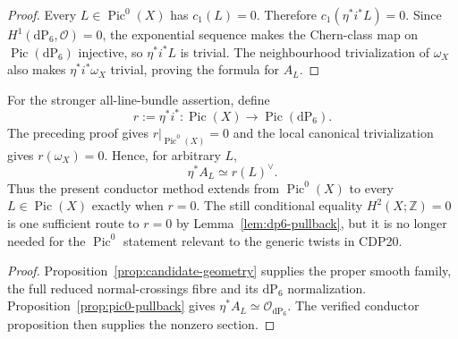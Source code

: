 
\begin{proof}
Every $L\in\operatorname{Pic}^0(X)$ has $c_1(L)=0$.  Therefore
$c_1(\eta^*i^*L)=0$.  Since
$H^1(\mathrm{dP}_6,\mathcal O)=0$, the exponential sequence makes the
Chern-class map on $\operatorname{Pic}(\mathrm{dP}_6)$ injective, so
$\eta^*i^*L$ is trivial.  The neighbourhood trivialization of $\omega_X$
also makes $\eta^*i^*\omega_X$ trivial, proving the formula for $A_L$.
\end{proof}

For the stronger all-line-bundle assertion, define
\[
 r:=\eta^*i^*:\operatorname{Pic}(X)\longrightarrow
 \operatorname{Pic}(\mathrm{dP}_6).
\]
The preceding proof gives $r|_{\operatorname{Pic}^0(X)}=0$ and the local
canonical trivialization gives $r(\omega_X)=0$.  Hence, for arbitrary $L$,
\[
 \eta^*A_L\simeq r(L)^\vee.
\]
Thus the present conductor method extends from $\operatorname{Pic}^0(X)$
to every $L\in\operatorname{Pic}(X)$ exactly when $r=0$.  The still
conditional equality $H^2(X;\mathbb Z)=0$ is one sufficient route to $r=0$
by Lemma~\ref{lem:dp6-pullback}, but it is no longer needed for the
$\operatorname{Pic}^0$ statement relevant to the generic twists in CDP20.


\begin{proof}
Proposition~\ref{prop:candidate-geometry} supplies the proper smooth family,
the full reduced normal-crossings fibre and its $\mathrm{dP}_6$
normalization.  Proposition~\ref{prop:pic0-pullback} gives
$\eta^*A_L\simeq\mathcal O_{\mathrm{dP}_6}$.  The verified conductor
proposition then supplies the nonzero section.
\end{proof}


